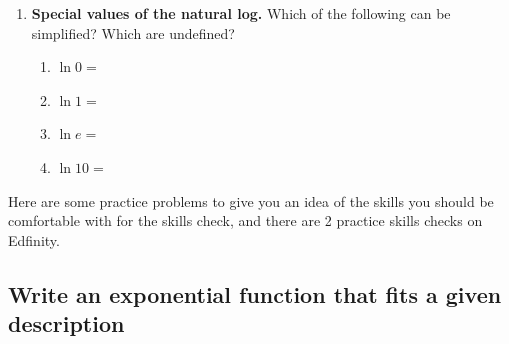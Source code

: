 \documentclass{article}
\theoremstyle{theorem}
\begin{document}
\begin{problemonly}
\begin{enumerate}
  \item \textbf{Special values of the natural log.} Which of the following can be simplified? Which are undefined?
    \begin{enumerate}
    \item $\ln 0 = {}$ 
    \item $\ln 1 = {}$ 
    \item $\ln e = {}$ 
    \item $\ln 10 = {}$ \fitb{1in}{}
    \end{enumerate}

  \end{enumerate}

  \newpage
  Here are some practice problems to give you an idea of the skills you should be comfortable with for the skills check, and there are 2 practice skills checks on Edfinity.
\end{problemonly}

\subsection*{Write an exponential function that fits a given description}
\end{document}
